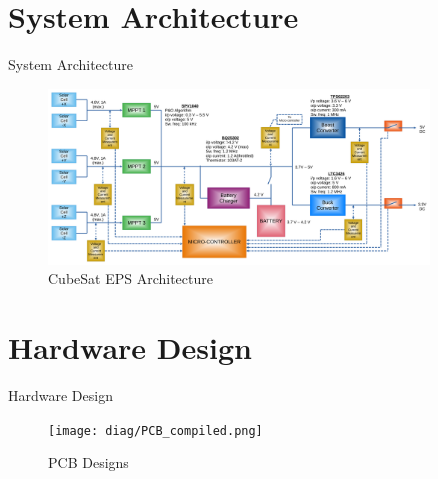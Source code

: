 \documentclass[aspectratio=169]{beamer}
\begin{document}
		
			
		
			
		
	
	
	
	\section{System Architecture}
	\begin{frame}{System Architecture}
		\begin{figure}[h]
			\centering
			\includegraphics[width=0.9\textwidth]{diag1 with specs.pdf}
			\caption{CubeSat EPS Architecture}
			\label{fig:mesh1}
		\end{figure}
		
		
	\end{frame}
	
	\section{Hardware Design}
	\begin{frame}{Hardware Design}
		\begin{figure}[h]
			\centering
			\texttt{[image: diag/PCB\_compiled.png]}
			\caption{PCB Designs}
			\label{fig:bubo}
		\end{figure}
	\end{frame}
	
\end{document}
